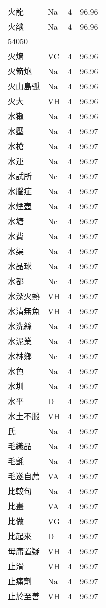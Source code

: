 \documentclass[twocolumn]{book}
\begin{document}
\begin{supertabular}{llrr}
火龍 & Na & 4 &  96.96\\
火燄 & Na & 4 &  96.96\\
54050\\
火燎 & VC & 4 &  96.96\\
火箭炮 & Na & 4 &  96.96\\
火山島弧 & Na & 4 &  96.96\\
火大 & VH & 4 &  96.96\\
水獺 & Na & 4 &  96.96\\
水壓 & Na & 4 &  96.97\\
水槍 & Na & 4 &  96.97\\
水運 & Na & 4 &  96.97\\
水試所 & Nc & 4 &  96.97\\
水腦症 & Na & 4 &  96.97\\
水煙壺 & Na & 4 &  96.97\\
水塘 & Nc & 4 &  96.97\\
水費 & Na & 4 &  96.97\\
水渠 & Na & 4 &  96.97\\
水晶球 & Na & 4 &  96.97\\
水都 & Nc & 4 &  96.97\\
水深火熱 & VH & 4 &  96.97\\
水清無魚 & VH & 4 &  96.97\\
水洗絲 & Na & 4 &  96.97\\
水泥業 & Na & 4 &  96.97\\
水林鄉 & Nc & 4 &  96.97\\
水色 & Na & 4 &  96.97\\
水圳 & Na & 4 &  96.97\\
水平 & D & 4 &  96.97\\
水土不服 & VH & 4 &  96.97\\
氏 & Na & 4 &  96.97\\
毛織品 & Na & 4 &  96.97\\
毛氈 & Na & 4 &  96.97\\
毛遂自薦 & VA & 4 &  96.97\\
比較句 & Na & 4 &  96.97\\
比畫 & VA & 4 &  96.97\\
比做 & VG & 4 &  96.97\\
比起來 & D & 4 &  96.97\\
毋庸置疑 & VH & 4 &  96.97\\
止滑 & VH & 4 &  96.97\\
止痛劑 & Na & 4 &  96.97\\
止於至善 & VH & 4 &  96.97\\

\end{supertabular}
\end{document}
